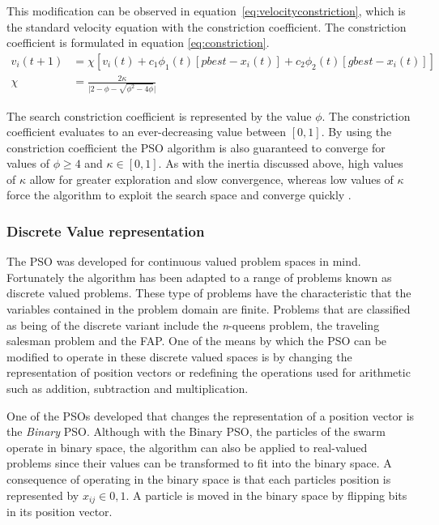 This modification can be observed in equation~\ref{eq:velocityconstriction}, which is the standard velocity equation with the constriction coefficient. The constriction coefficient is formulated in equation \ref{eq:constriction}\cite{adaptPSO,FundamentalSwarm,CompuIntelligenceIntro}.
\begin{align}
v_i(t+1) &= \chi[v_i(t) + c_1\phi_{1}(t)[pbest - x_i(t)] + c_2\phi_{2}(t)[gbest - x_i(t)]]\label{eq:velocityconstriction}\\
\chi &= \frac{2\kappa}{\lvert 2 - \phi - \sqrt{\phi^2 - 4\phi}\rvert}\label{eq:constriction}
\end{align}

The search constriction coefficient is represented by the value $\phi$. The constriction coefficient evaluates to an ever-decreasing value between $[0,1]$. By using the constriction coefficient the \gls{PSO} algorithm is also guaranteed to converge for values of $\phi \geq 4$ and $\kappa \in [0,1]$. As with the inertia discussed above, high values of $\kappa$ allow for greater exploration and slow convergence, whereas low values of $\kappa$ force the algorithm to exploit the search space and converge quickly \cite{adaptPSO,FundamentalSwarm,CompuIntelligenceIntro}.

\subsubsection{Discrete Value representation}

The \gls{PSO} was developed for continuous valued problem spaces in mind\cite{CompuIntelligenceIntro,FundamentalSwarm}. Fortunately the algorithm has been adapted to a range of problems known as discrete valued problems. These type of problems have the characteristic that the variables contained in the problem domain are finite\cite{CompuIntelligenceIntro,FundamentalSwarm}. Problems that are classified as being of the discrete variant include the \emph{n}-queens problem, the traveling salesman problem and the \gls{FAP}\cite{CompuIntelligenceIntro,FundamentalSwarm}. One of the means by which the \gls{PSO} can be modified to operate in these discrete valued spaces is by changing the representation of position vectors or redefining the operations used for arithmetic such as addition, subtraction and multiplication\cite{CompuIntelligenceIntro,FundamentalSwarm}.

One of the \glspl{PSO} developed that changes the representation of a position vector is the \emph{Binary} \gls{PSO}\cite{CompuIntelligenceIntro,FundamentalSwarm}. Although with the Binary \gls{PSO}, the particles of the swarm operate in binary space, the algorithm can also be applied to real-valued problems since their values can be transformed to fit into the binary space\cite{CompuIntelligenceIntro,FundamentalSwarm}. A consequence of operating in the binary space is that each particles position is represented by $x_{ij} \in {0,1}$\cite{CompuIntelligenceIntro,FundamentalSwarm}. A particle is moved in the binary space by flipping bits in its position vector\cite{CompuIntelligenceIntro,FundamentalSwarm}.

